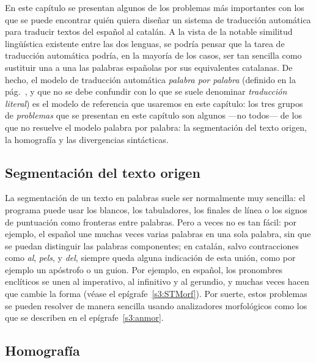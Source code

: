 En este capítulo se presentan algunos de los problemas más importantes con los que se puede encontrar quién quiera diseñar un sistema de traducción automática para traducir textos del español al catalán. A la vista de la notable similitud lingüística existente entre las dos lenguas, se podría pensar que la tarea de traducción automática podría, en la mayoría de los casos, ser tan sencilla como sustituir una a una las palabras españolas por sus equivalentes catalanas. De hecho, el modelo de traducción automática \emph{palabra por palabra} (definido en la pág.~\pageref{pg:mpm}, y que no se debe confundir con lo que se suele denominar \emph{traducción literal}) es el modelo de referencia que usaremos en este capítulo: los tres grupos de {\em problemas} que se presentan en este capítulo son algunos ---no todos--- de los que no resuelve el modelo palabra por palabra: la segmentación del texto origen, la homografía y las divergencias sintácticas. 

\subsection{Segmentación del texto origen} 

La segmentación de un texto en palabras suele ser normalmente muy sencilla: el programa puede usar los blancos, los tabuladores, los finales de línea o los signos de puntuación como fronteras entre palabras. Pero a veces no es tan fácil: por ejemplo, el español une muchas veces varias palabras en una sola palabra, sin que se  puedan distinguir las palabras componentes; en catalán, salvo contracciones como \emph{al}, \emph{pels}, y \emph{del}, siempre queda alguna indicación de esta unión, como por ejemplo un apóstrofo o un guion. Por ejemplo, en español, los pronombres enclíticos se unen al imperativo, al infinitivo y al gerundio, y muchas veces hacen que  cambie la forma (véase el epígrafe~\ref{s3:STMorf}). Por suerte, estos problemas se pueden resolver de manera sencilla usando analizadores morfológicos como los que se describen en el epígrafe~\ref{s3:anmor}. 

\subsection{Homografía} 

